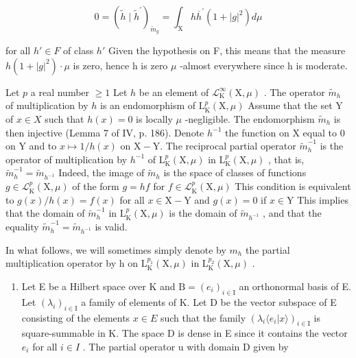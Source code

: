 \[
0 = (\widetilde {h} \mid \widetilde {h} ^ {\prime}) _ {\widetilde {m} _ {g}} = \int_ {\mathrm{X}} h \overline {{h}} ^ {\prime} (1 + | g | ^ {2}) d \mu
\]

for all \(h' \in F\) of class \(h'\) Given the hypothesis on F, this means that the measure \(h(1 + |g|^{2}) \cdot \mu\) is zero, hence h is zero \(\mu\) -almost everywhere since h is moderate.

Let \(p\) a real number \(\geqslant 1\) Let \(h\) be an element of \(\mathcal{L}_{\mathrm{K}}^{\infty}(\mathrm{X},\mu)\) . The operator \(\widetilde{m}_h\) of multiplication by \(h\) is an endomorphism of \(\mathrm{L}_{\mathrm{K}}^{p}(\mathrm{X},\mu)\) Assume that the set Y of \(x\in X\) such that \(h(x)=0\) is locally \(\mu\) -negligible. The endomorphism \(\widetilde{m}_h\) is then injective (Lemma 7 of IV, p. 186). Denote \(h^{-1}\) the function on X equal to 0 on Y and to \(x \mapsto 1/h(x)\) on \(\mathrm{X} - \mathrm{Y}\). The reciprocal partial operator \(\widetilde{m}_{h}^{-1}\) is the operator of multiplication by \(h^{-1}\) of \(\mathrm{L}_{\mathrm{K}}^{p}(\mathrm{X},\mu)\) in \(\mathrm{L}_{\mathrm{K}}^{p}(\mathrm{X},\mu)\) , that is, \(\widetilde{m}_{h}^{-1} = \widetilde{m}_{h^{-1}}\) Indeed, the image of \(\widetilde{m}_{h}\) is the space of classes of functions \(g \in \mathcal{L}_{\mathrm{K}}^{p}(\mathrm{X},\mu)\) of the form \(g = hf\) for \(f \in \mathcal{L}_{\mathrm{K}}^{p}(\mathrm{X},\mu)\) This condition is equivalent to \(g(x)/h(x) = f(x)\) for all \(x \in \mathrm{X} - \mathrm{Y}\) and \(g(x) = 0\) if \(x \in \mathrm{Y}\) This implies that the domain of \(\widetilde{m}_{h}^{-1}\) in \(\mathrm{L}_{\mathrm{K}}^{p}(\mathrm{X},\mu)\) is the domain of \(\widetilde{m}_{h^{-1}}\) , and that the equality \(\widetilde{m}_{h}^{-1} = \widetilde{m}_{h^{-1}}\) is valid.

In what follows, we will sometimes simply denote by \(m_{h}\) the partial multiplication operator by h on \(\mathrm{L}_{\mathrm{K}}^{p_{1}}(\mathrm{X},\mu)\) in \(\mathrm{L}_{\mathrm{K}}^{p_{2}}(\mathrm{X},\mu)\) .

\begin{enumerate}
\def\labelenumi{\arabic{enumi})}
\setcounter{enumi}{1}
\tightlist
\item
  Let E be a Hilbert space over K and \(\mathrm{B} = (e_i)_{i \in \mathrm{I}}\) an orthonormal basis of E. Let \((\lambda_i)_{i \in \mathrm{I}}\) a family of elements of K. Let D be the vector subspace of E consisting of the elements \(x \in E\) such that the family \((\lambda_i \langle e_i | x \rangle)_{i \in \mathrm{I}}\) is square-summable in K. The space D is dense in E since it contains the vector \(e_i\) for all \(i \in I\) . The partial operator u with domain D given by
\end{enumerate}

